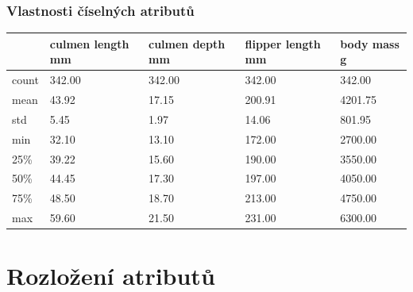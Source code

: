 \documentclass[10pt,xcolor=pdflatex,dvipsnames,table,oneside]{book}
\begin{document}
\subsubsection{Vlastnosti číselných atributů}
\vspace{1em}
\begin{tabular}{|l|l|l|l|l|}
    \hline
    & culmen length mm & culmen depth mm & flipper length mm & body mass g \\
    \hline
    \hline
    count  & 342.00 & 342.00 & 342.00 &  342.00 \\
    \hline
    mean   &  43.92 &  17.15 & 200.91 & 4201.75 \\
    \hline
    std    &   5.45 &   1.97 &  14.06 &  801.95 \\
    \hline
    min    &  32.10 &  13.10 & 172.00 & 2700.00 \\
    \hline
    25\%   &  39.22 &  15.60 & 190.00 & 3550.00 \\
    \hline
    50\%   &  44.45 &  17.30 & 197.00 & 4050.00 \\
    \hline
    75\%   &  48.50 &  18.70 & 213.00 & 4750.00 \\
    \hline
    max    &  59.60 &  21.50 & 231.00 & 6300.00 \\
    \hline
\end{tabular}

\section{Rozložení atributů}
\end{document}
